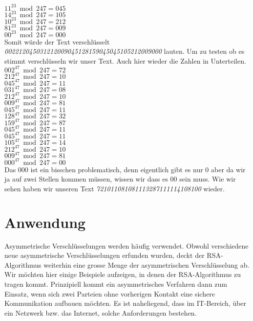 $ 11^{23} \bmod 247 = 045 $ \\
$ 14^{23} \bmod 247 = 105 $ \\
$ 10^{23} \bmod 247 = 212 $ \\
$ 81^{23} \bmod 247 = 009 $ \\
$ 00^{23} \bmod 247 = 000 $ \\
Somit würde der Text verschlüsselt \textit{002212045031212009045128159045045105212009000} lauten.
Um zu testen ob es stimmt verschlüsseln wir unser Text. Auch hier wieder die Zahlen in Unterteilen.
$ 002^{47} \bmod 247 = 72 $ \\
$ 212^{47} \bmod 247 = 10 $ \\
$ 045^{47} \bmod 247 = 11 $ \\
$ 031^{47} \bmod 247 = 08 $ \\
$ 212^{47} \bmod 247 = 10 $ \\
$ 009^{47} \bmod 247 = 81 $ \\
$ 045^{47} \bmod 247 = 11 $ \\
$ 128^{47} \bmod 247 = 32 $ \\
$ 159^{47} \bmod 247 = 87 $ \\
$ 045^{47} \bmod 247 = 11 $ \\
$ 045^{47} \bmod 247 = 11 $ \\
$ 105^{47} \bmod 247 = 14 $ \\
$ 212^{47} \bmod 247 = 10 $ \\
$ 009^{47} \bmod 247 = 81 $ \\
$ 000^{47} \bmod 247 = 00 $ \\
Das 000 ist ein bisschen problematisch, denn eigentlich gibt es nur 0 aber da wir ja auf zwei Stellen kommen müssen, wissen wir dass es 00 sein muss. Wie wir sehen haben wir unseren Text \textit{721011081081113287111114108100}  wieder.


\section{Anwendung}
Asymmetrische Verschlüsselungen werden häufig verwendet.  Obwohl verschiedene neue asymmetrische Verschlüsselungen erfunden wurden, deckt der RSA-Algorithmus weiterhin eine grosse Menge der asymmetrischen Verschlüsselung ab.\\
Wir möchten hier einige Beispiele aufzeigen, in denen der RSA-Algorithmus zu tragen kommt. Prinzipiell kommt ein asymmetrisches Verfahren dann zum Einsatz, wenn sich zwei Parteien ohne vorherigen Kontakt eine sichere Kommunikation aufbauen möchten. Es ist naheliegend, dass im IT-Bereich, über ein Netzwerk bzw. das Internet, solche Anforderungen bestehen.

